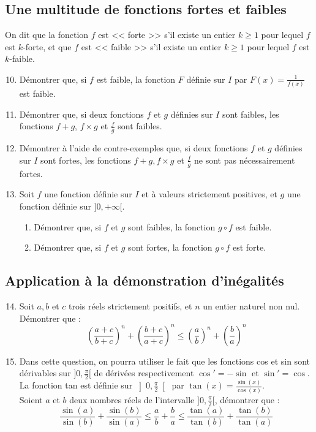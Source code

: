 \documentclass[landscape,twocolumn,leqno,a4paper,10pt]{report} %
\newcommand\n{\noindent}
\renewcommand{\geq}{\geqslant}
\renewcommand{\leq}{\leqslant}
\begin{document}
\subsection{Une multitude de fonctions fortes et faibles}

\n On dit que la fonction $f$ est << forte >> s'il existe un entier $k \geq 1$ pour lequel $f$ est $k$-forte, et que $f$ est << faible >> s'il existe un entier $k \geq 1$ pour lequel $f$ est $k$-faible.


\begin{enumerate}\setcounter{enumi}{9}
	\item Démontrer que, si $f$ est faible, la fonction $F$ définie sur $I$ par $F(x)=\frac{1}{f(x)}$ est faible.
	\item Démontrer que, si deux fonctions $f$ et $g$ définies sur $I$ sont faibles, les fonctions $f+g$, $f \times g$ et $\frac{f}{g}$ sont faibles.
	\item Démontrer à l'aide de contre-exemples que, si deux fonctions $f$ et $g$ définies sur $I$ sont fortes, les fonctions $f+g, f \times g$ et $\frac{f}{g}$ ne sont pas nécessairement fortes.
	\item Soit $f$ une fonction définie sur $I$ et à valeurs strictement positives, et $g$ une fonction définie sur $]0,+\infty[$.
	\begin{enumerate}
		\item Démontrer que, si $f$ et $g$ sont faibles, la fonction $g \circ f$ est faible.
		\item Démontrer que, si $f$ et $g$ sont fortes, la fonction $g \circ f$ est forte.
	\end{enumerate}
\end{enumerate}


\subsection{Application à la démonstration d'inégalités}


\begin{enumerate}\setcounter{enumi}{13}
	\item Soit $a, b$ et $c$ trois réels strictement positifs, et $n$ un entier naturel non nul. Démontrer que :
	$$\left(\frac{a+c}{b+c}\right)^{n}+\left(\frac{b+c}{a+c}\right)^{n} \leq\left(\frac{a}{b}\right)^{n}+\left(\frac{b}{a}\right)^{n}$$
	\item Dans cette question, on pourra utiliser le fait que les fonctions cos et sin sont dérivables sur $] 0, \frac{\pi}{2}[$ de dérivées respectivement $\cos'=-\sin$ et $\sin'=\cos$.\\
	La fonction tan est définie sur $\left]0,\frac{\pi}{2}\right[$ par $\tan (x)=\frac{\sin (x)}{\cos (x)}$.\\
	Soient $a$ et $b$ deux nombres réels de l'intervalle $]0, \frac{\pi}{2}[$, démontrer que :
	$$\frac{\sin (a)}{\sin (b)}+\frac{\sin (b)}{\sin (a)} \leq \frac{a}{b}+\frac{b}{a} \leq \frac{\tan (a)}{\tan (b)}+\frac{\tan (b)}{\tan (a)}$$
\end{enumerate}
\end{document}
